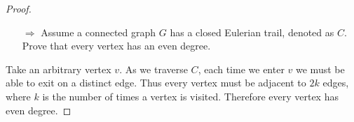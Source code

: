 \documentclass{beamer}
\begin{document}
\begin{frame}[t]
	\begin{proof}\renewcommand{\qedsymbol}{}
		\begin{enumerate}
			\item[$\Rightarrow$]
			Assume a connected graph $G$ has a closed Eulerian trail, denoted as $C$. Prove that every
			vertex has an even degree.
		\end{enumerate}
		Take an arbitrary vertex $v$. As we traverse $C$, each time we enter $v$ we must be able
		to exit on a distinct edge. Thus every vertex must be adjacent to $2k$ edges, where $k$
		is the number of times a vertex is visited. Therefore every vertex has even degree.
	\end{proof}

	\begin{figure}
		\centering
	\end{figure}
\end{frame}
\end{document}
